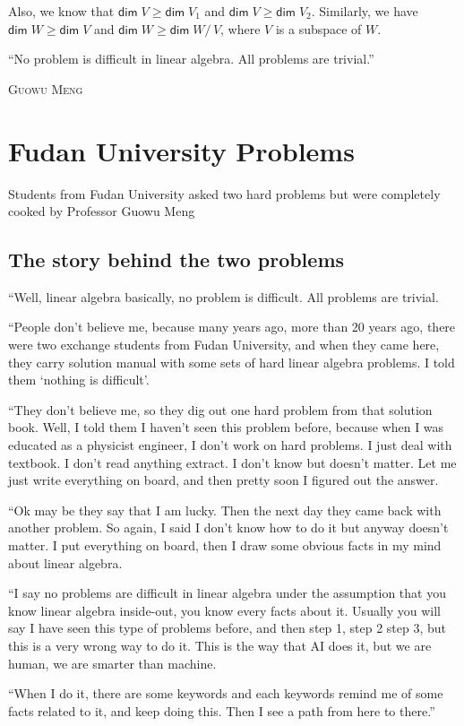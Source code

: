 \documentclass[
	11pt, %
	fleqn, %
	a4paper, %
]{LegrandOrangeBook}
\newcommand{\quotient}[2]{#1/\, #2} %
\renewcommand{\dim}{\mathsf{dim\;}} %
\let\originalepigraph\epigraph
\renewcommand\epigraph[2]{\originalepigraph{#1}{\textsc{#2}}}
\begin{document}
Also, we know that $\dim{V} \geq \dim{V_1}$ and $\dim{V} \geq \dim{V_2}$. Similarly, we have $\dim{W} \geq \dim{V}$ and $\dim{W} \geq \dim{\quotient{W}{V}}$, where $V$ is a subspace of $W$.

\newpage

\epigraph{``No problem is difficult in linear algebra. All problems are trivial.''}{Guowu Meng}

\section{Fudan University Problems}

Students from Fudan University asked two hard problems but were completely cooked by Professor Guowu Meng

\subsection{The story behind the two problems}
``Well, linear algebra basically, no problem is difficult. All problems are trivial. 

``People don't believe me, because many years ago, more than 20 years ago, there were two exchange students from Fudan University, and when they came here, they carry solution manual with some sets of hard linear algebra problems. I told them `nothing is difficult'. 

``They don't believe me, so they dig out one hard problem from that solution book. Well, I told them I haven't seen this problem before, because when I was educated as a physicist engineer, I don't work on hard problems. I just deal with textbook. I don't read anything extract. I don't know but doesn't matter. Let me just write everything on board, and then pretty soon I figured out the answer. 

``Ok may be they say that I am lucky. Then the next day they came back with another problem. So again, I said I don't know how to do it but anyway doesn't matter. I put everything on board, then I draw some obvious facts in my mind about linear algebra. 

``I say no problems are difficult in linear algebra under the assumption that you know linear algebra inside-out, you know every facts about it. Usually you will say I have seen this type of problems before, and then step 1, step 2 step 3, but this is a very wrong way to do it. This is the way that AI does it, but we are human, we are smarter than machine. 

``When I do it, there are some keywords and each keywords remind me of some facts related to it, and keep doing this. Then I see a path from here to there.'' 
\end{document}
